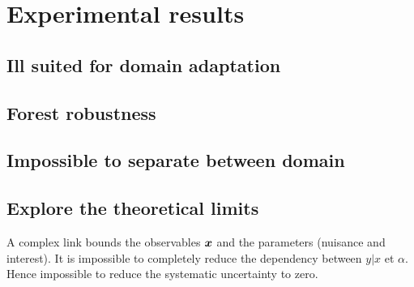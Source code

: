 
\chapter{Experimental results}
\label{chap:xp}
\ifpdf
    \graphicspath{{Chapter5/Figs/Raster/}{Chapter5/Figs/PDF/}{Chapter5/Figs/}}
\else
    \graphicspath{{Chapter5/Figs/Vector/}{Chapter5/Figs/}}
\fi


\section{Ill suited for domain adaptation} %
\label{sec:ill_suited_for_domain_adaptation}






\section{Forest robustness} %
\label{sec:forest_robustness}



\section{Impossible to separate between domain} %
\label{sec:impossible_to_separate_between_domain}

\content{}


\section{Explore the theoretical limits}

\content{}

A complex link bounds the observables ${\bm{x}}$ and the parameters (nuisance and interest).
It is impossible to completely reduce the dependency between $y|x$ et $\alpha$.
Hence impossible to reduce the systematic uncertainty to zero.

